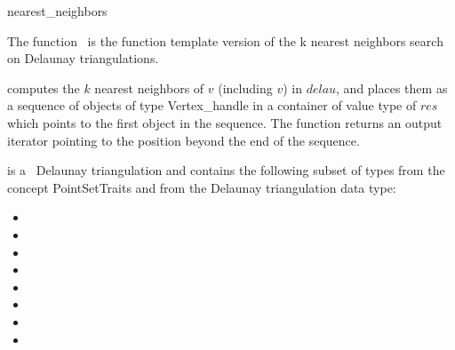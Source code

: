 
\begin{ccRefFunction}{nearest_neighbors}

\ccDefinition

The function \ccRefName\ is the function template version of the k nearest neighbors search on Delaunay
triangulations.


{computes the $k$ nearest neighbors of $v$ (including $v$) in $delau$, and places them as a sequence of objects of type
Vertex\_handle in a container of value type of $res$
which points to the first object in the sequence. The function
returns an output iterator pointing to the position beyond the end
of the sequence. }

 is a \cgal\ Delaunay triangulation and contains the following subset of types from the concept PointSetTraits and from
the Delaunay triangulation data type:
\begin{itemize}
  \item {}             
  \item {}                
  \item {}               
  \item {}            
  \item {}                                   
  \item {}                       
  \item {}                           
  \item {}    
\end{itemize}  
\end{ccRefFunction}
